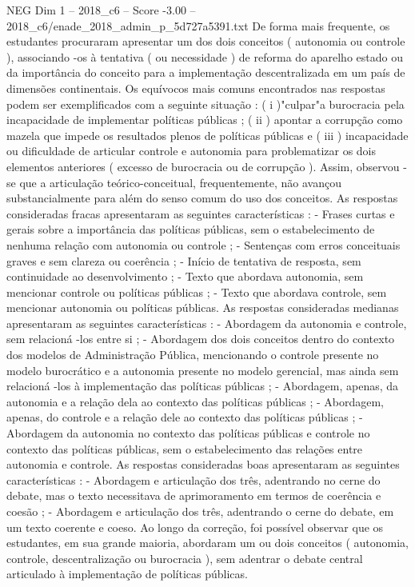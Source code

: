 \begin{textsample}{NEG Dim 1 – 2018\_c6 – Score -3.00 – 2018\_c6/enade\_2018\_admin\_p\_5d727a5391.txt}
De forma mais frequente, os estudantes procuraram apresentar um dos dois conceitos ( autonomia ou controle ), associando -os à tentativa ( ou necessidade ) de reforma do aparelho estado ou da importância do conceito para a implementação descentralizada em um país de dimensões continentais.
Os equívocos mais comuns encontrados nas respostas podem ser exemplificados com a seguinte situação : ( i )"culpar"a burocracia pela incapacidade de implementar políticas públicas ; ( ii ) apontar a corrupção como mazela que impede os resultados plenos de políticas públicas e ( iii ) incapacidade ou dificuldade de articular controle e autonomia para problematizar os dois elementos anteriores ( excesso de burocracia ou de corrupção ).
Assim, observou -se que a articulação teórico-conceitual, frequentemente, não avançou substancialmente para além do senso comum do uso dos conceitos.
As respostas consideradas fracas apresentaram as seguintes características : - Frases curtas e gerais sobre a importância das políticas públicas, sem o estabelecimento de nenhuma relação com autonomia ou controle ; - Sentenças com erros conceituais graves e sem clareza ou coerência ; - Início de tentativa de resposta, sem continuidade ao desenvolvimento ; - Texto que abordava autonomia, sem mencionar controle ou políticas públicas ; - Texto que abordava controle, sem mencionar autonomia ou políticas públicas.
As respostas consideradas medianas apresentaram as seguintes características : - Abordagem da autonomia e controle, sem relacioná -los entre si ; - Abordagem dos dois conceitos dentro do contexto dos modelos de Administração Pública, mencionando o controle presente no modelo burocrático e a autonomia presente no modelo gerencial, mas ainda sem relacioná -los à implementação das políticas públicas ; - Abordagem, apenas, da autonomia e a relação dela ao contexto das políticas públicas ; - Abordagem, apenas, do controle e a relação dele ao contexto das políticas públicas ; - Abordagem da autonomia no contexto das políticas públicas e controle no contexto das políticas públicas, sem o estabelecimento das relações entre autonomia e controle.
As respostas consideradas boas apresentaram as seguintes características : - Abordagem e articulação dos três, adentrando no cerne do debate, mas o texto necessitava de aprimoramento em termos de coerência e coesão ; - Abordagem e articulação dos três, adentrando o cerne do debate, em um texto coerente e coeso.
Ao longo da correção, foi possível observar que os estudantes, em sua grande maioria, abordaram um ou dois conceitos ( autonomia, controle, descentralização ou burocracia ), sem adentrar o debate central articulado à implementação de políticas públicas.

\end{textsample}
